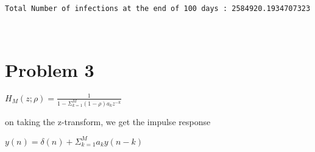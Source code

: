 \documentclass[11pt]{article}
\begin{document}
    \begin{Verbatim}[commandchars=\\\{\}]
Total Number of infections at the end of 100 days : 2584920.1934707323
    \end{Verbatim}

    \begin{center}
    \end{center}
    { \hspace*{\fill} \\}
    
    \hypertarget{problem-3}{%
\section{Problem 3}\label{problem-3}}

\(H_M(z;ρ) = \frac{1}{1 - \Sigma_{k=1}^{M}(1-ρ)a_kz^{-k}}\)

on taking the z-transform, we get the impulse response

\(y(n) = δ(n) + Σ_{k=1}^{M}a_ky(n-k)\)
\end{document}
